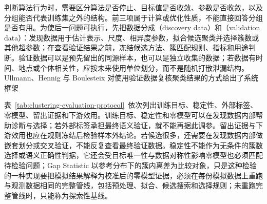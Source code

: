 判断算法行为时，需要区分算法是否停止、目标值是否收敛、参数是否收敛，以及分组能否代表训练集之外的结构。前三项属于计算或优化性质，不能直接回答分组是否有用。为使后一问题可执行，先把数据分成（discovery data）和（validation data）：发现数据用于估计表示、尺度、相异度参数，拟合候选聚类并选择簇数或其他超参数；在查看验证结果之前，冻结候选方法、簇匹配规则、指标和用途判断。验证数据可以是预先留出的同源样本，也可以是独立收集的数据；若数据有时间、地点或个体相关性，应按未来使用单位划分，而不是随机打散泄漏结构。Ullmann、Hennig 与 Boulesteix 对使用验证数据复核聚类结果的方式给出了系统框架

表~\ref{tab:clustering-evaluation-protocol}~依次列出训练目标、稳定性、外部标签、零模型、留出证据和下游效用。训练目标、稳定性和零模型可以在发现数据内部帮助诊断与选择；若外部标签承担最终语义验证，就不能再据此调参。留出证据与下游效用也应在规则冻结后检验样本外结论。若候选很多，还需要在发现数据内部做嵌套划分或交叉验证，不能反复查看最终验证数据。稳定性不能作为无条件的簇数选择或语义正确性判据，它还会受目标唯一性与数据对称性影响零模型也必须匹配待检验问题；Gap Statistic 以参考分布下的簇内离差为比较对象，只是这种检验的一种实现要把模拟结果解释为校准后的零模型证据，必须在每份模拟数据上重跑与观测数据相同的完整管线，包括预处理、拟合、候选搜索和选择规则；未重跑完整管线时，只能称为探索性基线。

